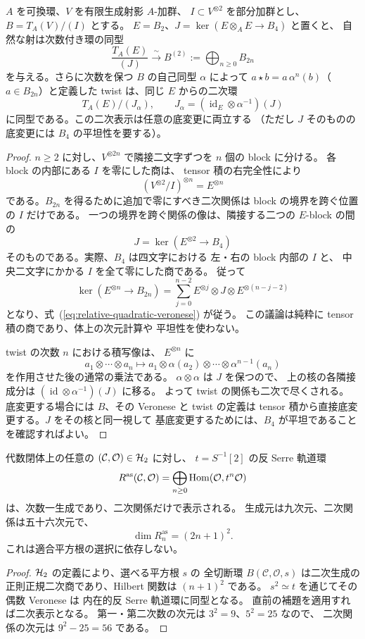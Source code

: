\begin{lemma}
\label{lem:relative-quadratic-veronese}
$A$ を可換環、$V$ を有限生成射影 $A$-加群、
$I\subset V^{\otimes2}$ を部分加群とし、
$B=T_A(V)/(I)$ とする。
$E=B_2$、$J=\ker(E\otimes_AE\to B_4)$ と置くと、
自然な射は次数付き環の同型
\[
 \frac{T_A(E)}{(J)}
    \xrightarrow{\ \sim\ } B^{(2)}
    :=\bigoplus_{n\ge0}B_{2n}
 \tag{QV}\label{eq:relative-quadratic-veronese}
\]
を与える。さらに次数を保つ $B$ の自己同型 $\alpha$ によって
$a\star b=a\,\alpha^n(b)$（$a\in B_{2n}$）と定義した
twist は、同じ $E$ からの二次環
\[
 T_A(E)/(J_\alpha),\qquad
 J_\alpha=(\operatorname{id}_E\otimes\alpha^{-1})(J)
\]
に同型である。この二次表示は任意の底変更に両立する
（ただし $J$ そのものの底変更には $B_4$ の平坦性を要する）。
\end{lemma}
\begin{proof}
$n\ge2$ に対し、$V^{\otimes2n}$ で隣接二文字ずつを
$n$ 個の block に分ける。
各 block の内部にある $I$ を零にした商は、
tensor 積の右完全性により
\[
 (V^{\otimes2}/I)^{\otimes n}=E^{\otimes n}
\]
である。$B_{2n}$ を得るために追加で零にすべき二次関係は
block の境界を跨ぐ位置の $I$ だけである。
一つの境界を跨ぐ関係の像は、隣接する二つの
$E$-block の間の
\[
 J=\ker(E^{\otimes2}\longrightarrow B_4)
\]
そのものである。実際、$B_4$ は四文字における
左・右の block 内部の $I$ と、
中央二文字にかかる $I$ を全て零にした商である。
従って
\[
 \ker(E^{\otimes n}\to B_{2n})
 =\sum_{j=0}^{n-2}
 E^{\otimes j}\otimes J\otimes
 E^{\otimes(n-j-2)}
\]
となり、式~(\ref{eq:relative-quadratic-veronese}) が従う。
この議論は純粋に tensor 積の商であり、体上の次元計算や
平坦性を使わない。

twist の次数 $n$ における積写像は、
$E^{\otimes n}$ に
\[
 a_1\otimes\cdots\otimes a_n
 \longmapsto
 a_1\otimes\alpha(a_2)\otimes\cdots
      \otimes\alpha^{n-1}(a_n)
\]
を作用させた後の通常の乗法である。
$\alpha\otimes\alpha$ は $J$ を保つので、
上の核の各隣接成分は
$(\operatorname{id}\otimes\alpha^{-1})(J)$ に移る。
よって twist の関係も二次で尽くされる。
底変更する場合には $B$、その Veronese と twist の定義は
tensor 積から直接底変更する。$J$ をその核と同一視して
基底変更するためには、$B_4$ が平坦であることを確認すればよい。
\end{proof}

\begin{corollary}
\label{cor:h2-intrinsic-antiserre-quadratic}
代数閉体上の任意の $(\mathcal C,\mathcal O)\in\mathcal H_2$ に対し、
$t=S^{-1}[2]$ の反 Serre 軌道環
\[
 R^{\mathrm{as}}(\mathcal C,\mathcal O)
 =\bigoplus_{n\ge0}\operatorname{Hom}(\mathcal O,t^n\mathcal O)
\]
は、次数一生成であり、二次関係だけで表示される。
生成元は九次元、二次関係は五十六次元で、
\[
 \dim R^{\mathrm{as}}_n=(2n+1)^2.
\]
これは適合平方根の選択に依存しない。
\end{corollary}
\begin{proof}
$\mathcal H_2$ の定義により、選べる平方根 $s$ の
全切断環 $B(\mathcal C,\mathcal O,s)$ は二次生成の
正則正規二次商であり、Hilbert 関数は $(n+1)^2$ である。
$s^2\simeq t$ を通じてその偶数 Veronese は
内在的反 Serre 軌道環に同型となる。
直前の補題を適用すれば二次表示となる。
第一・第二次数の次元は $3^2=9$、$5^2=25$ なので、
二次関係の次元は $9^2-25=56$ である。
\end{proof}

